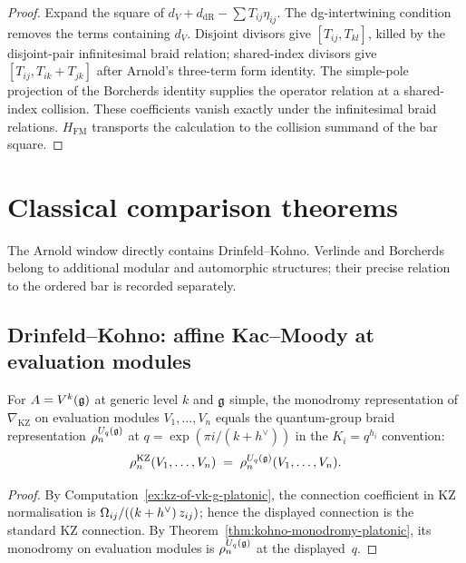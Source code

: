 \begin{proof}
Expand the square of
$d_V+d_{\mathrm{dR}}-\sum T_{ij}\eta_{ij}$.  The dg-intertwining
condition removes the terms containing $d_V$.  Disjoint divisors give
$[T_{ij},T_{kl}]$, killed by the disjoint-pair infinitesimal
braid relation; shared-index divisors give
$[T_{ij},T_{ik}+T_{jk}]$ after Arnold's three-term form identity.
The simple-pole projection of the Borcherds identity supplies the
operator relation at a shared-index collision.  These coefficients
vanish exactly under the infinitesimal braid relations.
$H_{\mathrm{FM}}$ transports the calculation to the collision
summand of the bar square.
\end{proof}

\section{Classical comparison theorems}
\label{sec:climax-platonic-classical-specialisations}

The Arnold window directly contains Drinfeld--Kohno.  Verlinde and
Borcherds belong to additional modular and automorphic structures;
their precise relation to the ordered bar is recorded separately.

\subsection{Drinfeld--Kohno: affine Kac--Moody at evaluation modules}
\label{ssec:climax-platonic-cor-DK}

\begin{corollary}
\label{cor:climax-drinfeld-kohno-platonic}
\ClaimStatusProvedElsewhere
For $A = V^{k}(\mathfrak{g})$ at generic level $k$ and $\mathfrak{g}$ simple, the
monodromy representation of $\nabla_{\mathrm{KZ}}$ on evaluation modules
$V_1, \dots, V_n$ equals the quantum-group braid representation
$\rho_n^{U_q(\mathfrak{g})}$ at $q=\exp(\pi i/(k+h^\vee))$ in the
$K_i=q^{h_i}$ convention:
\begin{equation}
\label{eq:climax-drinfeld-kohno-platonic}
 \rho_n^{\mathrm{KZ}}(V_1,\dots,V_n)
 \;=\; \rho_n^{U_q(\mathfrak{g})}(V_1,\dots,V_n).
\end{equation}
\end{corollary}

\begin{proof}
By Computation~\ref{ex:kz-of-vk-g-platonic}, the connection coefficient
in KZ normalisation is $\Omega_{ij}/((k+h^{\vee})\,z_{ij})$;
hence the displayed connection is the standard KZ connection. By
Theorem~\ref{thm:kohno-monodromy-platonic}, its monodromy on
evaluation modules is $\rho_n^{U_q(\mathfrak{g})}$ at the displayed~$q$.
\end{proof}

